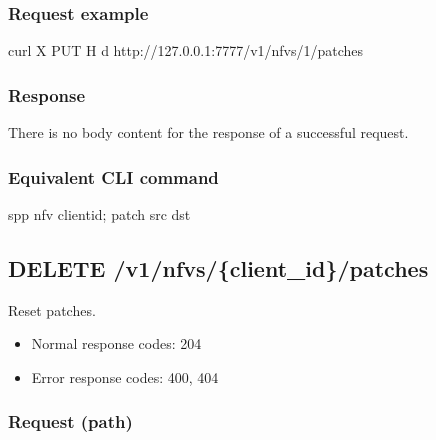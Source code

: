 \documentclass[a4paper,11pt,openany,oneside,english]{sphinxmanual}
\begin{document}
\subsubsection{Request example}
\label{\detokenize{api_ref/spp_nfv:id12}}
\begin{sphinxVerbatim}[commandchars=\\\{\},formatcom=\footnotesize]
 curl \PYGZhy{}X PUT \PYGZhy{}H  
  \PYGZhy{}d  
  http://127.0.0.1:7777/v1/nfvs/1/patches
\end{sphinxVerbatim}


\subsubsection{Response}
\label{\detokenize{api_ref/spp_nfv:id13}}
There is no body content for the response of a successful  request.


\subsubsection{Equivalent CLI command}
\label{\detokenize{api_ref/spp_nfv:id14}}
\begin{sphinxVerbatim}[commandchars=\\\{\},formatcom=\footnotesize]
spp \PYGZgt{} nfv \PYGZob{}client\PYGZus{}id\PYGZcb{}; patch \PYGZob{}src\PYGZcb{} \PYGZob{}dst\PYGZcb{}
\end{sphinxVerbatim}


\subsection{DELETE /v1/nfvs/\{client\_id\}/patches}
\label{\detokenize{api_ref/spp_nfv:delete-v1-nfvs-client-id-patches}}
Reset patches.
\begin{itemize}
\item {} 
Normal response codes: 204

\item {} 
Error response codes: 400, 404

\end{itemize}


\subsubsection{Request (path)}
\label{\detokenize{api_ref/spp_nfv:id15}}
\end{document}
